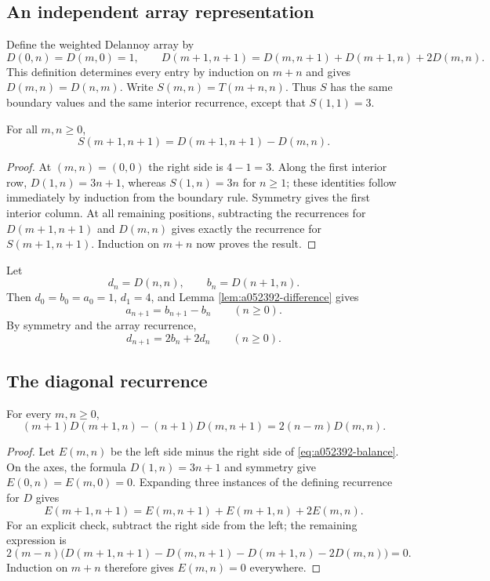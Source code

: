 \subsection{An independent array representation}

Define the weighted Delannoy array by
\[
 D(0,n)=D(m,0)=1,\qquad
 D(m+1,n+1)=D(m,n+1)+D(m+1,n)+2D(m,n).
\]
This definition determines every entry by induction on $m+n$ and gives
$D(m,n)=D(n,m)$. Write $S(m,n)=T(m+n,n)$. Thus $S$ has the same boundary
values and the same interior recurrence, except that $S(1,1)=3$.

\begin{lemma}\label{lem:a052392-difference}
For all $m,n\ge0$,
\[
 S(m+1,n+1)=D(m+1,n+1)-D(m,n).
\]
\end{lemma}
\begin{proof}
At $(m,n)=(0,0)$ the right side is $4-1=3$. Along the first interior
row, $D(1,n)=3n+1$, whereas $S(1,n)=3n$ for $n\ge1$; these identities
follow immediately by induction from the boundary rule. Symmetry gives
the first interior column. At all remaining positions, subtracting the
recurrences for $D(m+1,n+1)$ and $D(m,n)$ gives exactly the recurrence
for $S(m+1,n+1)$. Induction on $m+n$ now proves the result.
\end{proof}

Let
\[
 d_n=D(n,n),\qquad b_n=D(n+1,n).
\]
Then $d_0=b_0=a_0=1$, $d_1=4$, and Lemma
\ref{lem:a052392-difference} gives
\begin{equation}\label{eq:a052392-a-b}
 a_{n+1}=b_{n+1}-b_n\qquad(n\ge0).
\end{equation}
By symmetry and the array recurrence,
\begin{equation}\label{eq:a052392-d-b}
 d_{n+1}=2b_n+2d_n\qquad(n\ge0).
\end{equation}

\subsection{The diagonal recurrence}

\begin{lemma}\label{lem:a052392-balance}
For every $m,n\ge0$,
\begin{equation}\label{eq:a052392-balance}
 (m+1)D(m+1,n)-(n+1)D(m,n+1)=2(n-m)D(m,n).
\end{equation}
\end{lemma}
\begin{proof}
Let $E(m,n)$ be the left side minus the right side of
\eqref{eq:a052392-balance}. On the axes, the formula
$D(1,n)=3n+1$ and symmetry give $E(0,n)=E(m,0)=0$.
Expanding three instances of the defining recurrence for $D$ gives
\[
 E(m+1,n+1)=E(m,n+1)+E(m+1,n)+2E(m,n).
\]
For an explicit check, subtract the right side from the left; the
remaining expression is
\[
 2(m-n)\bigl(D(m+1,n+1)-D(m,n+1)-D(m+1,n)-2D(m,n)\bigr)=0.
\]
Induction on $m+n$ therefore gives $E(m,n)=0$ everywhere.
\end{proof}

